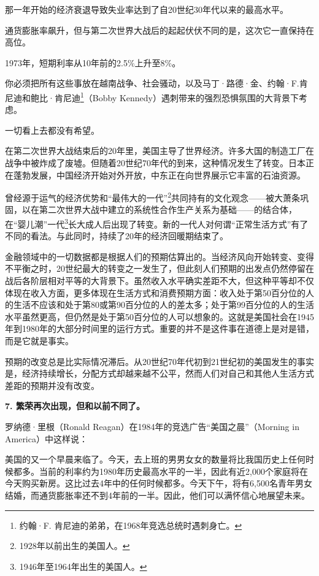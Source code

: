 那一年开始的经济衰退导致失业率达到了自20世纪30年代以来的最高水平。

通货膨胀率飙升，但与第二次世界大战后的起起伏伏不同的是，这次它一直保持在高位。

1973年，短期利率从10年前的2.5\%上升至8\%。

你必须把所有这些事放在越南战争、社会骚动，以及马丁·路德·金、约翰·F.肯尼迪和鲍比·肯尼迪\footnote{约翰·F. 肯尼迪的弟弟，在1968年竞选总统时遇刺身亡。}（Bobby Kennedy）遇刺带来的强烈恐惧氛围的大背景下考虑。

一切看上去都没有希望。

在第二次世界大战结束后的20年里，美国主导了世界经济。许多大国的制造工厂在战争中被炸成了废墟。但随着20世纪70年代的到来，这种情况发生了转变。日本正在蓬勃发展，中国经济开始对外开放，中东正在向世界展示它丰富的石油资源。

曾经源于运气的经济优势和“最伟大的一代”\footnote{1928年以前出生的美国人。}共同持有的文化观念——被大萧条巩固，以在第二次世界大战中建立的系统性合作生产关系为基础——的结合体，在“婴儿潮”一代\footnote{1946年至1964年出生的美国人。}长大成人后出现了转变。新的一代人对何谓“正常生活方式”有了不同的看法。与此同时，持续了20年的经济回暖期结束了。

金融领域中的一切数据都是根据人们的预期估算出的。当经济风向开始转变、变得不平衡之时，20世纪最大的转变之一发生了，但此刻人们预期的出发点仍然停留在战后各阶层相对平等的大背景下。虽然收入水平确实差距不大，但这种平等却不仅体现在收入方面，更多体现在生活方式和消费预期方面：收入处于第50百分位的人的生活不应该和处于第80或第90百分位的人的差太多；处于第99百分位的人的生活水平虽然更高，但仍然是处于第50百分位的人可以想象的。这就是美国社会在1945年到1980年的大部分时间里的运行方式。重要的并不是这件事在道德上是对是错，而是它就是事实。

预期的改变总是比实际情况滞后。从20世纪70年代初到21世纪初的美国发生的事实是，经济持续增长，分配方式却越来越不公平，然而人们对自己和其他人生活方式差距的预期并没有改变。

\textbf{7. 繁荣再次出现，但和以前不同了。}

罗纳德·里根（Ronald Reagan）在1984年的竞选广告“美国之晨”（Morning in America）中这样说：

{\kaishu

美国的又一个早晨来临了。今天，去上班的男男女女的数量将比我国历史上任何时候都多。当前的利率约为1980年历史最高水平的一半，因此有近2,000个家庭将在今天购买新房。这比过去4年中的任何时候都多。今天下午，将有6,500名青年男女结婚，而通货膨胀率还不到4年前的一半。因此，他们可以满怀信心地展望未来。

}

